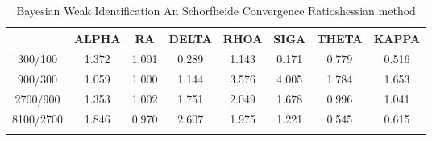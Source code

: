 \documentclass[a4paper,10pt]{article}
\begin{document}
\centering
\begin{longtable}{cccccccc}
\toprule
 & ALPHA & RA & DELTA & RHOA & SIGA & THETA & KAPPA \\
\midrule
300/100 & 1.372 & 1.001 & 0.289 & 1.143 & 0.171 & 0.779 & 0.516 \\
900/300 & 1.059 & 1.000 & 1.144 & 3.576 & 4.005 & 1.784 & 1.653 \\
2700/900 & 1.353 & 1.002 & 1.751 & 2.049 & 1.678 & 0.996 & 1.041 \\
8100/2700 & 1.846 & 0.970 & 2.607 & 1.975 & 1.221 & 0.545 & 0.615 \\
\bottomrule
\caption{Bayesian Weak Identification An Schorfheide Convergence Ratioshessian method}
\label{table:tbl:WeakAnSchoConvergenceRatios_hessian}
\end{longtable}
\end{document}
